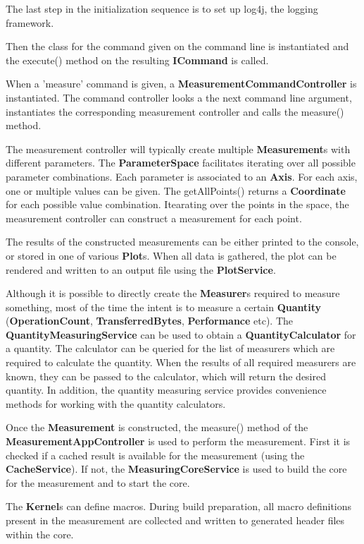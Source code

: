 \documentclass[a4paper,12pt]{article}
\newcommand{\class}[1]{\textbf{#1}}
\newcommand{\method}[1]{\textsf{#1}}
\begin{document}
The last step in the initialization sequence is to set up log4j, the logging
framework. 

Then the class for the command given on the command line is instantiated and
the \method{execute()} method on the resulting \class{ICommand} is called.

When a 'measure' command is given, a \class{MeasurementCommandController} is
instantiated. The command controller looks a the next command line argument,
instantiates the corresponding measurement controller and calls the
\method{measure()} method.

The measurement controller will typically create multiple \class{Measurement}s
with different parameters. The \class{ParameterSpace} facilitates iterating
over all possible parameter combinations. Each parameter is associated to an
\class{Axis}. For each axis, one or multiple values can be given. The
\method{getAllPoints()} returns a \class{Coordinate} for each possible value
combination. Itearating over the points in the space, the measurement controller
can construct a measurement for each point. 

The results of the constructed measurements can be either printed to the
console, or stored in one of various \class{Plot}s. When all data is gathered,
the plot can be rendered and written to an output file using the
\class{PlotService}.

Although it is possible to directly create the \class{Measurer}s required to
measure something, most of the time the intent is to measure a certain
\class{Quantity} (\class{OperationCount}, \class{TransferredBytes},
\class{Performance} etc). The \class{QuantityMeasuringService} can be used to
obtain a \class{QuantityCalculator} for a quantity. The calculator can be
queried for the list of measurers which are required to calculate the quantity.
When the results of all required measurers are known, they can be passed to the
calculator, which will return the desired quantity. In addition, the quantity
measuring service provides convenience methods for working with the quantity
calculators.

Once the \class{Measurement} is constructed, the \method{measure()} method of
the  \class{MeasurementAppController} is used to perform the measurement. First
it is checked if a cached result is available for the measurement (using the
\class{CacheService}). If not, the \class{MeasuringCoreService} is used to build
the core for the measurement and to start the core.

The \class{Kernel}s can define macros. During build preparation, all macro
definitions present in the measurement are collected and written to generated
header files within the core.
\end{document}

